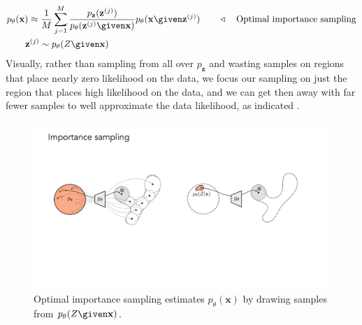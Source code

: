 \begin{align}
    &p_{\theta}(\mathbf{x}) \approx \frac{1}{M} \sum_{j=1}^M\frac{p_{\mathbf{z}}(\mathbf{z}^{(j)})}{p_{\theta}(\mathbf{z}^{(j)} \given \mathbf{x})} p_{\theta}(\mathbf{x} \given \mathbf{z}^{(j)}) \quad\quad \triangleleft \quad\text{Optimal importance sampling}\label{eqn:generative_models_and_representation_learning:vae_importance_sampling}\\
    &\quad\quad \mathbf{z}^{(j)} \sim p_{\theta}(Z \given \mathbf{x}) \nonumber
\end{align}
Visually, rather than sampling from all over $p_{\mathbf{z}}$ and wasting samples on regions that place nearly zero likelihood on the data, we focus our sampling on just the region that places high likelihood on the data, and we can get then away with far
fewer samples to well approximate the data likelihood, as indicated \fig{\ref{fig:generative_modeling_and_representation_learning:vae_importance_sampling2}}.
\begin{figure}[h!]
    \centerline{
    \includegraphics[width=0.5\linewidth]{./figures/generative_modeling_and_representation_learning/vae_importance_sampling2.pdf}
    }
    \caption{Optimal importance sampling estimates $p_{\theta}(\mathbf{x})$ by drawing samples from $p_{\theta}(Z \given \mathbf{x})$.}
    \label{fig:generative_modeling_and_representation_learning:vae_importance_sampling2}
\end{figure}


